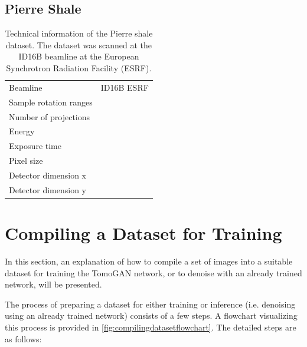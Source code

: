 \subsection{Pierre Shale}
\label{sec:method:datasets:shale}
\begin{table}[htbp]
    \centering
    \caption[[Technical information of the Pierre shale dataset]{Technical information of the Pierre shale dataset. The dataset was scanned at the ID16B beamline at the European Synchrotron Radiation Facility (ESRF). }
    \label{tab:pierreshale}
    \begin{tabular}{ll}
    \hline
    Beamline & ID16B ESRF\\
    Sample rotation ranges &  \\
    Number of projections &  \\
    Energy & \\
    Exposure time & \\
    Pixel size & \\
    Detector dimension x &  \\
    Detector dimension y &  \\
    \hline
    \end{tabular}
\end{table}


\section{Compiling a Dataset for Training}
\label{sec:method:compilingdataset}
In this section, an explanation of how to compile a set of images into a suitable dataset for training the TomoGAN network, or to denoise with an already trained network, will be presented. 

The process of preparing a dataset for either training or inference (i.e. denoising using an already trained network) consists of a few steps. A flowchart visualizing this process is provided in \cref{fig:compilingdatasetflowchart}. The detailed steps are as follows:

